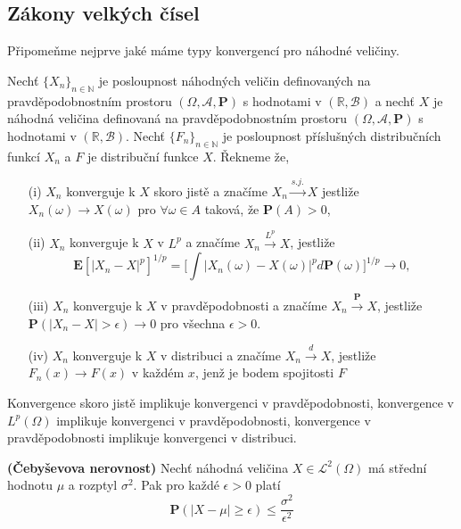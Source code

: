 \subsection{Zákony velkých čísel}
Připomeňme nejprve jaké máme typy konvergencí pro náhodné veličiny.
\begin{definition}
Nechť $\lbrace X_{n} \rbrace_{n \in \mathbb{N}}$ je posloupnost náhodných veličin definovaných na pravděpodobnostním prostoru $(\Omega, \mathcal{A}, \textbf{P})$ s hodnotami v $(\mathbb{R}, \mathcal{B})$ a nechť $X$ je náhodná veličina definovaná na pravděpodobnostním prostoru $(\Omega, \mathcal{A}, \textbf{P})$ s hodnotami v $(\mathbb{R}, \mathcal{B})$. Nechť $\lbrace F_{n} \rbrace_{n \in \mathbb{N}}$ je posloupnost příslušných distribučních funkcí $X_{n}$ a $F$ je distribuční funkce $X$.  Řekneme že,
\begin{itemize}
\item[(i)] $X_{n}$ konverguje k $X$ skoro jistě a značíme $X_{n} \xrightarrow{s.j.} X$ jestliže $X_{n}(\omega) \longrightarrow X(\omega)$ pro $\forall \omega \in A$ taková, že $\textbf{P}(A) > 0$,
\item[(ii)] $X_{n}$ konverguje k $X$ v $L^{p}$ a značíme $X_{n} \xrightarrow{L^{p}} X$, jestliže 
\begin{equation}
\mathbf{E}[|X_{n} - X|^{p}]^{1/p} = \bigg[ \int |X_{n}(\omega) - X(\omega)|^{p}d\textbf{P}(\omega)\bigg]^{1/p} \longrightarrow 0,
\end{equation}
\item[(iii)] $X_{n}$ konverguje k $X$ v pravděpodobnosti a značíme $X_{n} \xrightarrow{\mathbf{P}} X$, jestliže $\textbf{P}(|X_{n} - X| > \epsilon) \longrightarrow 0$ pro všechna $\epsilon > 0$.
\item[(iv)] $X_{n}$ konverguje k $X$ v distribuci a značíme $X_{n} \xrightarrow{d} X$, jestliže $F_{n}(x) \longrightarrow F(x)$ v každém $x$, jenž je bodem spojitosti $F$
\end{itemize}
\end{definition}

\begin{remark}
Konvergence skoro jistě implikuje konvergenci v pravděpodobnosti, konvergence v $L^{p}(\Omega)$ implikuje konvergenci v pravděpodobnosti, konvergence v pravděpodobnosti implikuje konvergenci v distribuci.
\end{remark}

\begin{theorem}\label{Chebychev1}{\textbf{(Čebyševova nerovnost)}}
Nechť náhodná veličina $X \in \mathcal{L}^{2}(\Omega)$ má střední hodnotu $\mu$ a rozptyl $\sigma^{2}$. Pak pro každé $\epsilon > 0$ platí
\begin{equation}
\textbf{P}(|X - \mu | \geq \epsilon) \leq \frac{\sigma^{2}}{\epsilon^{2}}
\end{equation}
\end{theorem}

